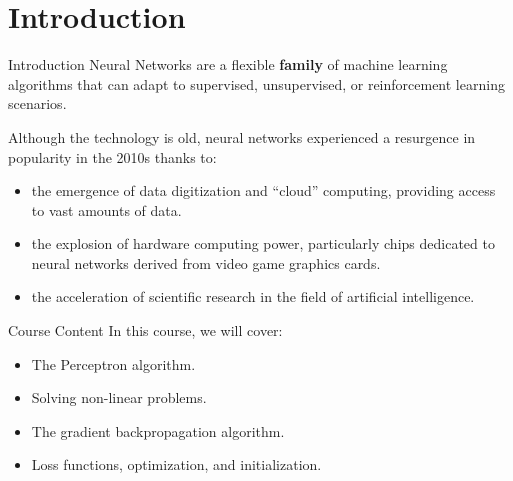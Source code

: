 \section[Introduction]{Introduction}

\begin{frame}{Introduction}
	Neural Networks are a flexible \textbf{family} of machine learning algorithms that can adapt to supervised, unsupervised, or reinforcement learning scenarios.
	
	\vspace{0.3cm}
	
	Although the technology is old, neural networks experienced a resurgence in popularity in the 2010s thanks to:
	\begin{itemize}
		\item the emergence of data digitization and ``cloud'' computing, providing access to vast amounts of data.
		\pause
		\item the explosion of hardware computing power, particularly chips dedicated to neural networks derived from video game graphics cards.
		\pause
		\item the acceleration of scientific research in the field of artificial intelligence.
	\end{itemize}
	
\end{frame}

\begin{frame}{Course Content}
	In this course, we will cover:
	\begin{itemize}
		\pause
		\item The Perceptron algorithm.
		\pause
		\item Solving non-linear problems.
		\pause
		\item The gradient backpropagation algorithm.
		\pause
		\item Loss functions, optimization, and initialization.
	\end{itemize}
\end{frame}